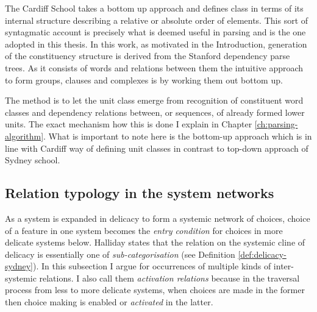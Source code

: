     The Cardiff School takes a bottom up approach and defines class in terms of its internal structure describing a relative or absolute order of elements. This sort of syntagmatic account is precisely what is deemed useful in parsing and is the one adopted in this thesis. 
    In this work, as motivated in the Introduction, generation of the constituency structure is derived from the Stanford dependency parse trees. As it consists of words and relations between them the intuitive approach to form groups, clauses and complexes is by working them out bottom up. 
    
    The method is to let the unit class emerge from recognition of constituent word classes and dependency relations between, or sequences, of already formed lower units. The exact mechanism how this is done I explain in Chapter \ref{ch:parsing-algorithm}. What is important to note here is the bottom-up approach which is in line with Cardiff way of defining unit classes in contrast to top-down approach of Sydney school.
    

\subsection{Relation typology in the system networks}
    
    As a system is expanded in delicacy to form a systemic network of choices, choice of a feature in one system becomes the \textit{entry condition} for choices in more delicate systems below. Halliday states that the relation on the systemic cline of delicacy is essentially one of \textit{sub-categorisation} (see Definition \ref{def:delicacy-sydney}). In this subsection I argue for occurrences of multiple kinds of inter-systemic relations. I also call them \textit{activation relations} because in the traversal process from less to more delicate systems, when choices are made in the former then choice making is enabled or \textit{activated} in the latter.
    
